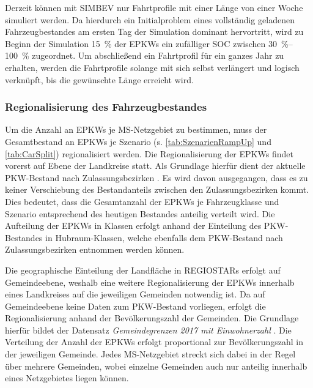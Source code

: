 Derzeit können mit \gls{SIMBEV} nur Fahrtprofile mit einer Länge von einer Woche simuliert werden.
Da hierdurch ein Initialproblem eines vollständig geladenen Fahrzeugbestandes am ersten Tag der Simulation dominant hervortritt, wird zu Beginn der Simulation \SI{15}{\percent} der \glspl{EPKW} ein zufälliger \gls{SOC} zwischen \SIrange[range-phrase=~bis~]{30}{100}{\percent} zugeordnet.
Um abschließend ein Fahrtprofil für ein ganzes Jahr zu erhalten, werden die Fahrtprofile solange mit sich selbst verlängert und logisch verknüpft, bis die gewünschte Länge erreicht wird.


\subsubsection{Regionalisierung des Fahrzeugbestandes}

Um die Anzahl an \glspl{EPKW} je \gls{MS}-Netzgebiet zu bestimmen, muss der Gesamtbestand an \glspl{EPKW} je Szenario (s. \autoref{tab:SzenarienRampUp} und \autoref{tab:CarSplit}) regionalisiert werden.
Die Regionalisierung der \glspl{EPKW} findet vorerst auf Ebene der Landkreise statt.
Als Grundlage hierfür dient der aktuelle \gls{PKW}-Bestand nach Zulassungsbezirken \cite[][Stand: ]{KBAPLZ2020}.
Es wird davon ausgegangen, dass es zu keiner Verschiebung des Bestandanteils zwischen den Zulassungsbezirken kommt.
Dies bedeutet, dass die Gesamtanzahl der \glspl{EPKW} je Fahrzeugklasse und Szenario entsprechend des heutigen Bestandes anteilig verteilt wird.
Die Aufteilung der \glspl{EPKW} in Klassen erfolgt anhand der Einteilung des \gls{PKW}-Bestandes in Hubraum-Klassen, welche ebenfalls dem \gls{PKW}-Bestand nach Zulassungsbezirken entnommen werden können.\medskip

Die geographische Einteilung der Landfläche in \glspl{REGIOSTAR} erfolgt auf Gemeindeebene, weshalb eine weitere Regionalisierung der \glspl{EPKW} innerhalb eines Landkreises auf die jeweiligen Gemeinden notwendig ist.
Da auf Gemeindeebene keine Daten zum \gls{PKW}-Bestand vorliegen, erfolgt die Regionalisierung anhand der Bevölkerungszahl der Gemeinden.
Die Grundlage hierfür bildet der Datensatz \textit{Gemeindegrenzen 2017 mit Einwohnerzahl} \cite[][Stand: ]{EDG2020}.
Die Verteilung der Anzahl der \glspl{EPKW} erfolgt proportional zur Bevölkerungszahl in der jeweiligen Gemeinde.
Jedes \gls{MS}-Netzgebiet streckt sich dabei in der Regel über mehrere Gemeinden, wobei einzelne Gemeinden auch nur anteilig innerhalb eines Netzgebietes liegen können.\medskip

